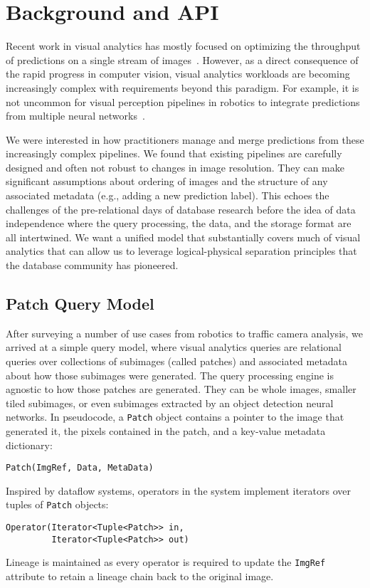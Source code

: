 \section{Background and API}
Recent work in visual analytics has mostly focused on optimizing the throughput of predictions on a single stream of images~\cite{anderson2018predicate, kang2018blazeit,kang2017noscope, wu2018querying, sparks2017keystoneml}.
However, as a direct consequence of the rapid progress in computer vision, visual analytics workloads are becoming increasingly complex with requirements beyond this paradigm. 
For example, it is not uncommon for visual perception pipelines in robotics to integrate predictions from multiple neural networks~\cite{hodson2018robots}.

We were interested in how practitioners manage and merge predictions from these increasingly complex pipelines. 
We found that existing pipelines are carefully designed and often not robust to changes in image resolution. They can make significant assumptions about ordering of images and the structure of any associated metadata (e.g., adding a new prediction label).
This echoes the challenges of the pre-relational days of database research before the idea of data independence where the query processing, the data, and the storage format are all intertwined.
We want a unified model that substantially covers much of visual analytics that can allow us to leverage logical-physical separation principles that the database community has pioneered.

\subsection{Patch Query Model}
After surveying a number of use cases from robotics to traffic camera analysis, we arrived at a simple query model, where visual analytics queries are relational queries over collections of subimages (called patches) and associated metadata about how those subimages were generated.
The query processing engine is agnostic to how those patches are generated.
They can be whole images, smaller tiled subimages, or even subimages extracted by an object detection neural networks.
In pseudocode, a \texttt{Patch} object contains a pointer to the image that generated it, the pixels contained in the patch, and a key-value metadata dictionary:
\begin{lstlisting}
Patch(ImgRef, Data, MetaData)
\end{lstlisting}
Inspired by dataflow systems, operators in the system implement iterators over tuples of \texttt{Patch} objects:
\begin{lstlisting}
Operator(Iterator<Tuple<Patch>> in, 
         Iterator<Tuple<Patch>> out)
\end{lstlisting}
Lineage is maintained as every operator is required to update the \texttt{ImgRef} attribute to retain a lineage chain back to the original image.

